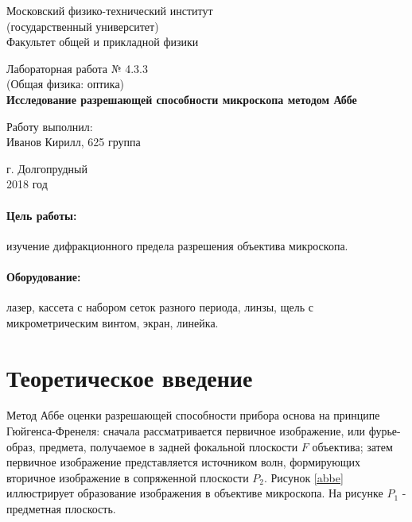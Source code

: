 \documentclass[12pt]{kiarticle} %
\begin{document}
	
	\begin{titlepage}
		\begin{center}
			\large 	Московский физико-технический институт \\
			(государственный университет) \\
			Факультет общей и прикладной физики \\
			\vspace{0.2cm}
			
			\vspace{4.5cm}
			Лабораторная работа № 4.3.3 \\ \vspace{0.2cm}
			\large (Общая физика: оптика) \\ \vspace{0.2cm}
			\LARGE \textbf{Исследование разрешающей способности микроскопа методом Аббе}
		\end{center}
		\vspace{2.3cm} \large
		
		\begin{center}
			Работу выполнил: \\
			Иванов Кирилл,
			625 группа
			\vspace{10mm}		
			
		\end{center}
		
		\begin{center} \vspace{60mm}
			г. Долгопрудный \\
			2018 год
		\end{center}
	\end{titlepage}
	
	\paragraph*{Цель работы:} изучение дифракционного предела разрешения объектива микроскопа. 
	
	\paragraph*{Оборудование:} лазер, кассета с набором сеток разного периода, линзы, щель с микрометрическим винтом, экран, линейка. 
	
	\section{Теоретическое введение}
	
	Метод Аббе оценки разрешающей способности прибора основа на принципе Гюйгенса-Френеля: сначала рассматривается первичное изображение, или фурье-образ, предмета, получаемое в задней фокальной плоскости $F$ объектива; затем первичное изображение представляется источником волн, формирующих вторичное изображение в сопряженной плоскости $P_2$. Рисунок \ref{abbe} иллюстрирует образование изображения в объективе микроскопа. На рисунке $P_1$ - предметная плоскость. 
	
\end{document}
